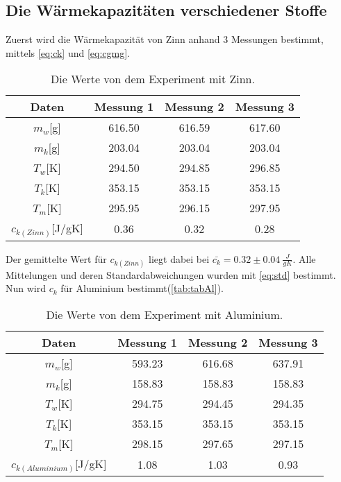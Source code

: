 \subsection{Die Wärmekapazitäten verschiedener Stoffe}
Zuerst wird die Wärmekapazität von Zinn anhand 3 Messungen bestimmt, mittels \autoref{eq:ck} und \autoref{eq:cgmg}.
  \begin{table}[htp]
    \centering
    \caption{Die Werte von dem Experiment mit Zinn.}
    \label{tab:tabZn}
    \begin{tabular}{c c c c}
      \toprule
      Daten & Messung 1 & Messung 2 & Messung 3\\
      \midrule
            \(m_w\)[g] & 616.50 & 616.59 & 617.60\\
            \(m_k\)[g] & 203.04 & 203.04 & 203.04\\
            \(T_w\)[K] & 294.50 & 294.85 & 296.85\\
            \(T_k\)[K] & 353.15 & 353.15 & 353.15\\
            \(T_m\)[K] & 295.95 & 296.15 & 297.95\\
      \bottomrule
            \(c_{k(Zinn)}\)[J/gK] & 0.36 & 0.32 & 0.28\\
    \end{tabular}
  \end{table}

Der gemittelte Wert für $c_{k(Zinn)}$ liegt dabei bei $\bar{c_k} = 0.32\pm 0.04\ \frac{J}{gK}$.
Alle Mittelungen und deren Standardabweichungen wurden mit \autoref{eq:std} bestimmt.\\
\newline
Nun wird $c_k$ für Aluminium bestimmt(\autoref{tab:tabAl}).
  \begin{table}[htp]
    \centering
    \caption{Die Werte von dem Experiment mit Aluminium.}
    \label{tab:tabAl}
    \begin{tabular}{c c c c}
      \toprule
      Daten & Messung 1 & Messung 2 & Messung 3\\
      \midrule
            \(m_w\)[g] & 593.23 & 616.68 & 637.91\\
            \(m_k\)[g] & 158.83 & 158.83 & 158.83\\
            \(T_w\)[K] & 294.75 & 294.45 & 294.35\\
            \(T_k\)[K] & 353.15 & 353.15 & 353.15\\
            \(T_m\)[K] & 298.15 & 297.65 & 297.15\\
      \bottomrule
            \(c_{k(Aluminium)}\)[J/gK] & 1.08 & 1.03 & 0.93\\
    \end{tabular}
  \end{table}

